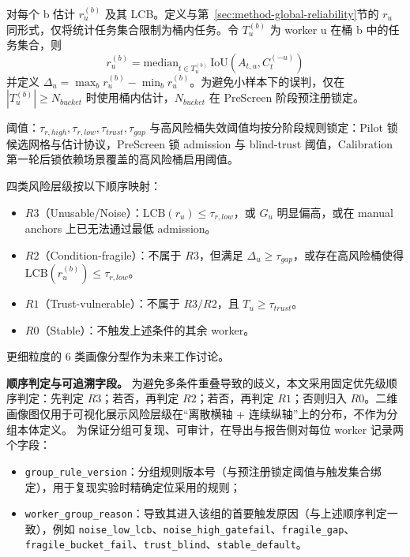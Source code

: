 对每个 b 估计 $r_u^{(b)}$ 及其 LCB。定义与第~\ref{sec:method-global-reliability}节的 $r_u$ 同形式，仅将统计任务集合限制为桶内任务。令 $T_u^{(b)}$ 为 worker u 在桶 b 中的任务集合，则
\[r_u^{(b)}=\mathrm{median}_{t\in T_u^{(b)}}\,\mathrm{IoU}\left(A_{t,u},C_t^{\left(-u\right)}\right)\]
并定义 $\Delta_u=\max_b r_u^{(b)}-\min_b r_u^{(b)}$。为避免小样本下的误判，仅在 $\left|T_u^{(b)}\right|\ge N_{bucket}$ 时使用桶内估计，$N_{bucket}$ 在 PreScreen 阶段预注册锁定。

阈值：$\tau_{r,high},\tau_{r,low},\tau_{trust},\tau_{gap}$ 与高风险桶失效阈值均按分阶段规则锁定：Pilot 锁候选网格与估计协议，PreScreen 锁 admission 与 blind-trust 阈值，Calibration 第一轮后锁依赖场景覆盖的高风险桶启用阈值。

四类风险层级按以下顺序映射：
\begin{itemize}
    \item $R3$（Unusable/Noise）：$\mathrm{LCB}(r_u)\le\tau_{r,low}$，或 $G_u$ 明显偏高，或在 manual anchors 上已无法通过最低 admission。
    \item $R2$（Condition-fragile）：不属于 $R3$，但满足 $\Delta_u\ge\tau_{gap}$，或存在高风险桶使得 $\mathrm{LCB}(r_u^{(b)})\le\tau_{r,low}$。
    \item $R1$（Trust-vulnerable）：不属于 $R3/R2$，且 $T_u\ge\tau_{trust}$。
    \item $R0$（Stable）：不触发上述条件的其余 worker。
\end{itemize}
更细粒度的 6 类画像分型作为未来工作讨论。

\noindent \textbf{顺序判定与可追溯字段。}
为避免多条件重叠导致的歧义，本文采用固定优先级顺序判定：先判定 $R3$；若否，再判定 $R2$；若否，再判定 $R1$；否则归入 $R0$。二维画像图仅用于可视化展示风险层级在“离散横轴 + 连续纵轴”上的分布，不作为分组本体定义。
为保证分组可复现、可审计，在导出与报告侧对每位 worker 记录两个字段：
\begin{itemize}
    \item \texttt{group\_rule\_version}：分组规则版本号（与预注册锁定阈值与触发集合绑定），用于复现实验时精确定位采用的规则；
    \item \texttt{worker\_group\_reason}：导致其进入该组的首要触发原因（与上述顺序判定一致），例如 \texttt{noise\_low\_lcb}、\texttt{noise\_high\_gatefail}、\texttt{fragile\_gap}、\texttt{fragile\_bucket\_fail}、\texttt{trust\_blind}、\texttt{stable\_default}。
\end{itemize}


